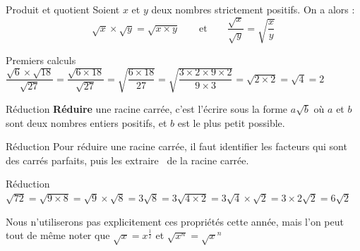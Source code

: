 \documentclass[oneside,12pt]{article}          %
\begin{document}
\begin{propriete}{Produit et quotient}
	Soient $x$ et $y$ deux nombres strictement positifs. On a alors :
	\[ \sqrt{x} \times \sqrt{y} = \sqrt{x \times y} \qquad \text{et} \qquad \dfrac{\sqrt{x}}{\sqrt{y}} = \sqrt{\dfrac{x}{y}} \]
\end{propriete}

\begin{exemple}{Premiers calculs}
	$\dfrac{\sqrt{6} \times \sqrt{18}}{\sqrt{27}} = \dfrac{\sqrt{6 \times 18}}{\sqrt{27}} = \sqrt{\dfrac{6 \times 18}{27}} = \sqrt{\dfrac{3 \times 2 \times 9 \times 2}{9 \times 3}} = \sqrt{2 \times 2} = \sqrt{4} = 2$
\end{exemple}



\begin{definition}{Réduction}
	\textbf{Réduire} une racine carrée, c'est l'écrire sous la forme $a\sqrt{b}$ où $a$ et $b$ sont deux nombres entiers positifs, et $b$ est le plus petit possible.
\end{definition}

\begin{methode}{Réduction}
	Pour réduire une racine carrée, il faut identifier les facteurs qui sont des carrés parfaits, puis les \og extraire \fg\, de la racine carrée.
\end{methode}

\begin{exemple}{Réduction}
	$\sqrt{72}=\sqrt{9 \times 8} = \sqrt{9} \times \sqrt{8} = 3\sqrt{8} = 3\sqrt{4 \times 2} = 3\sqrt{4}\times \sqrt{2} = 3 \times 2 \sqrt{2} = 6\sqrt{2}$
\end{exemple}



\begin{astuce}
	Nous n'utiliserons pas explicitement ces propriétés cette année, mais l'on peut tout de même noter que $\sqrt{x}=x^{\frac{1}{2}}$ \quad et \quad $\sqrt{x^n}=\sqrt{x}^n$
\end{astuce}
\end{document}
